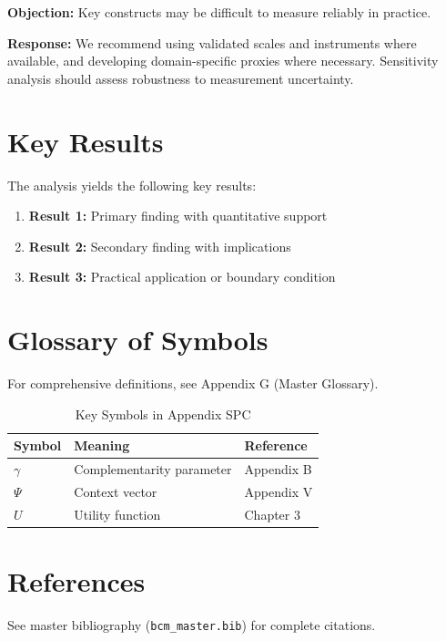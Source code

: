 \textbf{Objection:} Key constructs may be difficult to measure reliably in
practice.

\textbf{Response:} We recommend using validated scales and instruments where
available, and developing domain-specific proxies where necessary. Sensitivity
analysis should assess robustness to measurement uncertainty.





\section{Key Results}
\label{sec:spc-results}

The analysis yields the following key results:

\begin{enumerate}
    \item \textbf{Result 1:} Primary finding with quantitative support
    \item \textbf{Result 2:} Secondary finding with implications
    \item \textbf{Result 3:} Practical application or boundary condition
\end{enumerate}

\section{Glossary of Symbols}
\label{sec:spc-glossary}

For comprehensive definitions, see Appendix G (Master Glossary).

\begin{table}[htbp]
\centering
\caption{Key Symbols in Appendix SPC}
\begin{tabular}{lll}
\toprule
\textbf{Symbol} & \textbf{Meaning} & \textbf{Reference} \\
\midrule
$\gamma$ & Complementarity parameter & Appendix B \\
$\Psi$ & Context vector & Appendix V \\
$U$ & Utility function & Chapter 3 \\
\bottomrule
\end{tabular}
\end{table}


\section{References}
\label{sec:spc-references}

See master bibliography (\texttt{bcm\_master.bib}) for complete citations.

\nocite{bcm_master}


